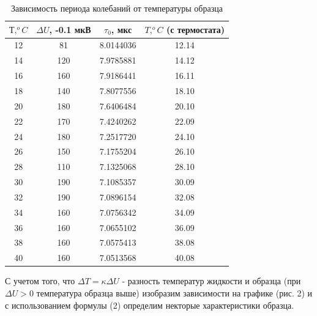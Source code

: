 \documentclass[12pt,a4paper]{article}
\begin{document}
\begin{table}[H]
    \centering
    \begin{tabular}{|c|c|c|c|}
    \hline
    $Т,  ^oC$ & $\Delta U$, -0.1 мкВ & $\tau_0$, мкс & $T, ^oC$ (с термостата) \\ \hline
    12        & 81                   & 8.0144036     & 12.14                   \\ \hline
    14        & 120                  & 7.9785881     & 14.12                   \\ \hline
    16        & 160                  & 7.9186441     & 16.11                   \\ \hline
    18        & 140                  & 7.8077556     & 18.10                   \\ \hline
    20        & 180                  & 7.6406484     & 20.10                   \\ \hline
    22        & 170                  & 7.4240262     & 22.09                   \\ \hline
    24        & 180                  & 7.2517720     & 24.10                   \\ \hline
    26        & 150                  & 7.1755204     & 26.10                   \\ \hline
    28        & 110                  & 7.1325068     & 28.10                   \\ \hline
    30        & 190                  & 7.1085357     & 30.09                   \\ \hline
    32        & 190                  & 7.0896154     & 32.08                   \\ \hline
    34        & 160                  & 7.0756342     & 34.09                   \\ \hline
    36        & 160                  & 7.0655102     & 36.09                   \\ \hline
    38        & 160                  & 7.0575413     & 38.08                   \\ \hline
    40        & 160                  & 7.0513568     & 40.08                   \\ \hline
    \end{tabular}
    \caption{Зависимость периода колебаний от температуры образца}
\end{table}

С учетом того, что $\Delta T = \kappa \Delta U$ - разность температур жидкости и образца (при $\Delta U > 0$ температура образца выше) изобразим зависимости на графике (рис. 2) и с использованием формулы (2) определим некторые характеристики образца.
\end{document}
